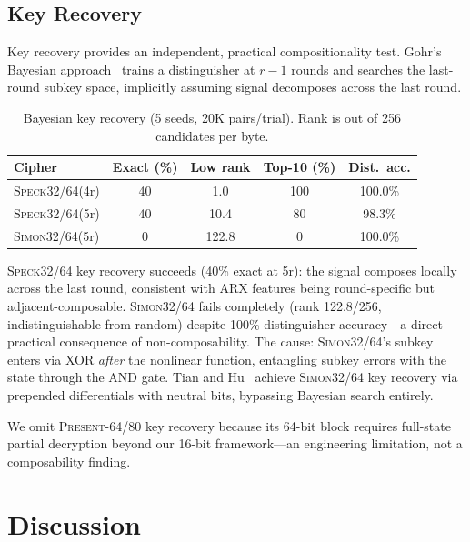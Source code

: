 \documentclass[runningheads]{llncs}
\newcommand{\speck}{\textsc{Speck32/64}\xspace}
\newcommand{\simon}{\textsc{Simon32/64}\xspace}
\newcommand{\present}{\textsc{Present-64/80}\xspace}
\begin{document}
\subsection{Key Recovery}
\label{sec:exp-key}

Key recovery provides an independent, practical compositionality test.
Gohr's Bayesian approach~\cite{gohr2019} trains a distinguisher at $r{-}1$ rounds and searches the last-round subkey space, implicitly assuming signal decomposes across the last round.

\begin{table}[t]
\centering
\caption{Bayesian key recovery (5 seeds, 20K pairs/trial).
         Rank is out of 256 candidates per byte.}\label{tab:key}
\begin{tabular}{@{}lcccc@{}}
\toprule
\textbf{Cipher} & \textbf{Exact (\%)} & \textbf{Low rank} & \textbf{Top-10 (\%)} & \textbf{Dist.\ acc.} \\
\midrule
\speck (4r) & 40 & 1.0  & 100 & 100.0\% \\
\speck (5r) & 40 & 10.4 & 80  & 98.3\%  \\
\simon (5r) & 0  & 122.8 & 0  & 100.0\% \\
\bottomrule
\end{tabular}
\end{table}

\speck key recovery succeeds (40\% exact at 5r): the signal composes locally across the last round, consistent with ARX features being round-specific but adjacent-composable.
\simon fails completely (rank 122.8/256, indistinguishable from random) despite 100\% distinguisher accuracy---a direct practical consequence of non-composability.
The cause: \simon's subkey enters via XOR \emph{after} the nonlinear function, entangling subkey errors with the state through the AND gate.
Tian and Hu~\cite{tian2022simon} achieve \simon key recovery via prepended differentials with neutral bits, bypassing Bayesian search entirely.

We omit \present key recovery because its 64-bit block requires full-state partial decryption beyond our 16-bit framework---an engineering limitation, not a composability finding.


\section{Discussion}
\label{sec:discussion}
\end{document}
